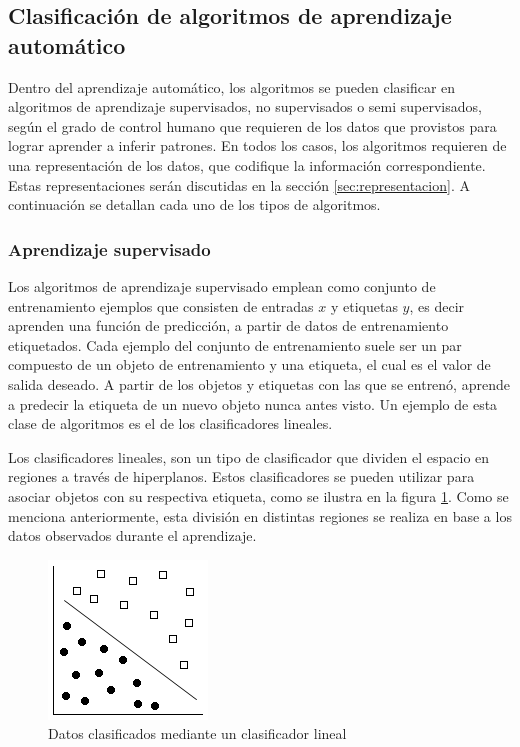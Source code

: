 \documentclass[a4paper,11pt,spanish]{book}
\begin{document}
      
    \subsection{Clasificación de algoritmos de aprendizaje automático}
      Dentro del aprendizaje automático, los algoritmos se pueden clasificar en algoritmos de aprendizaje supervisados, no supervisados o semi supervisados,
      según el grado de control humano que requieren de los datos que provistos para lograr aprender a inferir patrones. 
      En todos los casos, los algoritmos requieren de una representación de los datos, que codifique la información correspondiente. 
      Estas representaciones serán discutidas en la sección \ref{sec:representacion}.
      A continuación se detallan cada uno de los tipos de algoritmos.
      
      \subsubsection{Aprendizaje supervisado} \label{sec:supervisado}
	Los algoritmos de aprendizaje supervisado emplean como conjunto de entrenamiento ejemplos que consisten de entradas $x$ y etiquetas $y$, es decir
	aprenden una función de predicción, a partir de datos de entrenamiento etiquetados. 
	Cada ejemplo del conjunto de entrenamiento suele ser un par compuesto de un objeto de entrenamiento y una etiqueta, el cual es el valor de salida deseado.
	A partir de los objetos y etiquetas con las que se entrenó, aprende a predecir la etiqueta de un nuevo objeto nunca antes visto. 
	Un ejemplo de esta clase de algoritmos es el de los clasificadores lineales.

	Los clasificadores lineales, son un tipo de clasificador que dividen el espacio en regiones a través de hiperplanos. 
	Estos clasificadores se pueden utilizar para asociar objetos con su respectiva etiqueta, como se ilustra en la figura \ref{fig:svm}.
	Como se menciona anteriormente, esta división en distintas regiones se realiza en base a los datos observados durante el aprendizaje.

	\begin{figure}[H]
	  \includegraphics[scale=0.5]{./img/linear_svm.png}
	  \caption{Datos clasificados mediante un clasificador lineal}
	  \label{fig:svm}
	\end{figure}
\end{document}
